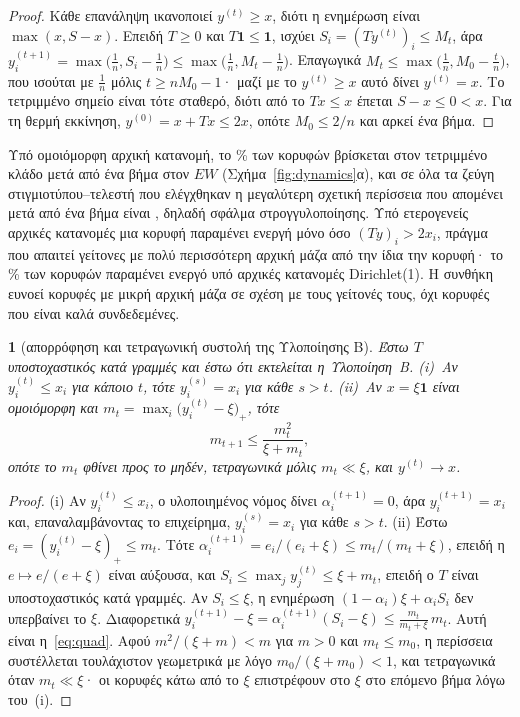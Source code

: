 \documentclass[11pt,a4paper]{article}
\theoremstyle{definition}
\theoremstyle{plain}
\newcommand{\genpropname}{}
\newtheorem*{genprop}{\genpropname}
\newenvironment{prop}[1]{\renewcommand{\genpropname}{Πρόταση #1}\begin{genprop}}{\end{genprop}}
\newcommand{\one}{\mathbf{1}}
\begin{document}
\begin{proof}
Κάθε επανάληψη ικανοποιεί $y^{(t)}\ge x$, διότι η ενημέρωση είναι $\max(x,S-x)$. Επειδή $T\ge0$ και $T\one\le\one$, ισχύει $S_i=(Ty^{(t)})_i\le M_t$, άρα $y^{(t+1)}_i=\max\big(\tfrac1n,S_i-\tfrac1n\big)\le\max\big(\tfrac1n,M_t-\tfrac1n\big)$. Επαγωγικά $M_t\le\max\big(\tfrac1n,M_0-\tfrac tn\big)$, που ισούται με $\tfrac1n$ μόλις $t\ge nM_0-1$· μαζί με το $y^{(t)}\ge x$ αυτό δίνει $y^{(t)}=x$. Το τετριμμένο σημείο είναι τότε σταθερό, διότι από το $Tx\le x$ έπεται $S-x\le0<x$. Για τη θερμή εκκίνηση, $y^{(0)}=x+Tx\le2x$, οπότε $M_0\le2/n$ και αρκεί ένα βήμα.
\end{proof}

Υπό ομοιόμορφη αρχική κατανομή, το \TrivAOneUnif\% των κορυφών βρίσκεται στον τετριμμένο κλάδο μετά από ένα βήμα στον $EW$ (Σχήμα~\ref{fig:dynamics}α), και σε όλα τα ζεύγη στιγμιοτύπου--τελεστή που ελέγχθηκαν η μεγαλύτερη σχετική περίσσεια που απομένει μετά από ένα βήμα είναι \CollapseExcess, δηλαδή σφάλμα στρογγυλοποίησης. Υπό ετερογενείς αρχικές κατανομές μια κορυφή παραμένει ενεργή μόνο όσο $(Ty)_i>2x_i$, πράγμα που απαιτεί γείτονες με πολύ περισσότερη αρχική μάζα από την ίδια την κορυφή· το \ActADirEnd\% των κορυφών παραμένει ενεργό υπό αρχικές κατανομές Dirichlet(1). Η συνθήκη ευνοεί κορυφές με μικρή αρχική μάζα σε σχέση με τους γείτονές τους, όχι κορυφές που είναι καλά συνδεδεμένες.

\begin{prop}{B}[απορρόφηση και τετραγωνική συστολή της Υλοποίησης Β]
Έστω $T$ υποστοχαστικός κατά γραμμές και έστω ότι εκτελείται η Υλοποίηση~Β. (i)~Αν $y_i^{(t)}\le x_i$ για κάποιο $t$, τότε $y_i^{(s)}=x_i$ για κάθε $s>t$. (ii)~Αν $x=\xi\one$ είναι ομοιόμορφη και $m_t=\max_i\big(y_i^{(t)}-\xi\big)_+$, τότε
\begin{equation}\label{eq:quad}
m_{t+1}\le\frac{m_t^2}{\xi+m_t},
\end{equation}
οπότε το $m_t$ φθίνει προς το μηδέν, τετραγωνικά μόλις $m_t\ll\xi$, και $y^{(t)}\to x$.
\end{prop}

\begin{proof}
(i) Αν $y_i^{(t)}\le x_i$, ο υλοποιημένος νόμος δίνει $\alpha_i^{(t+1)}=0$, άρα $y_i^{(t+1)}=x_i$ και, επαναλαμβάνοντας το επιχείρημα, $y_i^{(s)}=x_i$ για κάθε $s>t$. (ii) Έστω $e_i=(y_i^{(t)}-\xi)_+\le m_t$. Τότε $\alpha_i^{(t+1)}=e_i/(e_i+\xi)\le m_t/(m_t+\xi)$, επειδή η $e\mapsto e/(e+\xi)$ είναι αύξουσα, και $S_i\le\max_jy^{(t)}_j\le\xi+m_t$, επειδή ο $T$ είναι υποστοχαστικός κατά γραμμές. Αν $S_i\le\xi$, η ενημέρωση $(1-\alpha_i)\xi+\alpha_iS_i$ δεν υπερβαίνει το $\xi$. Διαφορετικά $y_i^{(t+1)}-\xi=\alpha_i^{(t+1)}(S_i-\xi)\le\frac{m_t}{m_t+\xi}\,m_t$. Αυτή είναι η~\eqref{eq:quad}. Αφού $m^2/(\xi+m)<m$ για $m>0$ και $m_t\le m_0$, η περίσσεια συστέλλεται τουλάχιστον γεωμετρικά με λόγο $m_0/(\xi+m_0)<1$, και τετραγωνικά όταν $m_t\ll\xi$· οι κορυφές κάτω από το $\xi$ επιστρέφουν στο $\xi$ στο επόμενο βήμα λόγω του~(i).
\end{proof}
\end{document}
